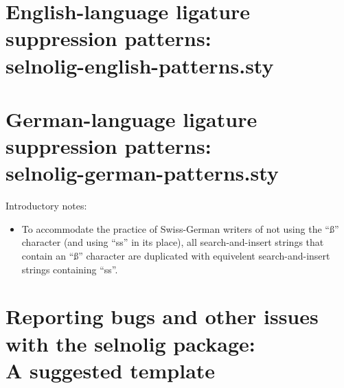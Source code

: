\documentclass[12pt]{article}
\newcommand{\pkg}[1]{\textsf{#1}}
\begin{document}

\clearpage
{}

\section[English-language ligature suppression patterns: selnolig-english-patterns.sty]{English-language ligature suppression patterns: \\ 
\pkg{selnolig-english-patterns.sty}}
\label{sec:eng-listing}

\begin{multicols}{2}
\end{multicols}

\clearpage
\section[German-language ligature suppression patterns:
selnolig-german-patterns.sty]{German-language ligature suppression patterns: \\ 
\pkg{selnolig-german-patterns.sty}}
\label{sec:germ-listing}

\begin{multicols}{2}

Introductory notes: 
\begin{itemize}

\item To accommodate the practice of Swiss-German writers of not using the \enquote{ß} character (and using \enquote{ss} in its place), all search-and-insert strings that contain an \enquote{ß} character are duplicated with equivelent search-and-insert strings containing \enquote{ss}.

\end{itemize}


\end{multicols}

\clearpage
\section[Reporting bugs and other issues with the selnolig package: A suggested template]{Reporting bugs and other issues with the \pkg{selnolig} package:\\A suggested template} \label{sec:template}

\end{document}
